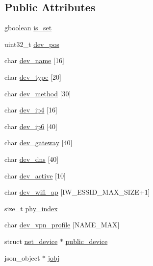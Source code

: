 \subsection*{Public Attributes}
\begin{DoxyCompactItemize}
\item 
gboolean \hyperlink{structnet__device_af10284ed56562f2cd96fdb5ef22005d7}{is\+\_\+set}
\item 
uint32\+\_\+t \hyperlink{structnet__device_a8201165f1f516678fdbddffe8c786dd7}{dev\+\_\+pos}
\item 
char \hyperlink{structnet__device_a683f88ff26dc8478bba51b95c39d9b92}{dev\+\_\+name} \mbox{[}16\mbox{]}
\item 
char \hyperlink{structnet__device_a65788d250a2b47bbbafeedfaa99ac695}{dev\+\_\+type} \mbox{[}20\mbox{]}
\item 
char \hyperlink{structnet__device_af33238d65f52774902101ad3255372f4}{dev\+\_\+method} \mbox{[}30\mbox{]}
\item 
char \hyperlink{structnet__device_a92b5a35950b5bfaeb721be117e241528}{dev\+\_\+ip4} \mbox{[}16\mbox{]}
\item 
char \hyperlink{structnet__device_a7a8e6311682a530bfdeda88cfa808ed1}{dev\+\_\+ip6} \mbox{[}40\mbox{]}
\item 
char \hyperlink{structnet__device_ad708824b9b388d466795dc764d6fc477}{dev\+\_\+gateway} \mbox{[}40\mbox{]}
\item 
char \hyperlink{structnet__device_ac9ae8e657fb43f5baafd0fafcee819fa}{dev\+\_\+dns} \mbox{[}40\mbox{]}
\item 
char \hyperlink{structnet__device_a1759ef9f942f991bff24268b2fc90c59}{dev\+\_\+active} \mbox{[}10\mbox{]}
\item 
char \hyperlink{structnet__device_a5f2de2bdeda68898f48a0d9347239e04}{dev\+\_\+wifi\+\_\+ap} \mbox{[}I\+W\+\_\+\+E\+S\+S\+I\+D\+\_\+\+M\+A\+X\+\_\+\+S\+I\+ZE+1\mbox{]}
\item 
size\+\_\+t \hyperlink{structnet__device_a793c401280eb3afa81db485466aa77f2}{phy\+\_\+index}
\item 
char \hyperlink{structnet__device_ab9c29f0a4280c9f26bfedd0d7fd39789}{dev\+\_\+vpn\+\_\+profile} \mbox{[}N\+A\+M\+E\+\_\+\+M\+AX\mbox{]}
\item 
struct \hyperlink{structnet__device}{net\+\_\+device} $\ast$ \hyperlink{structnet__device_aa50aa45beac692be04baf4faf9d063d4}{public\+\_\+device}
\item 
json\+\_\+object $\ast$ \hyperlink{structnet__device_ae3906a433b76b87e2c54069df9d5a342}{jobj}
\end{DoxyCompactItemize}


